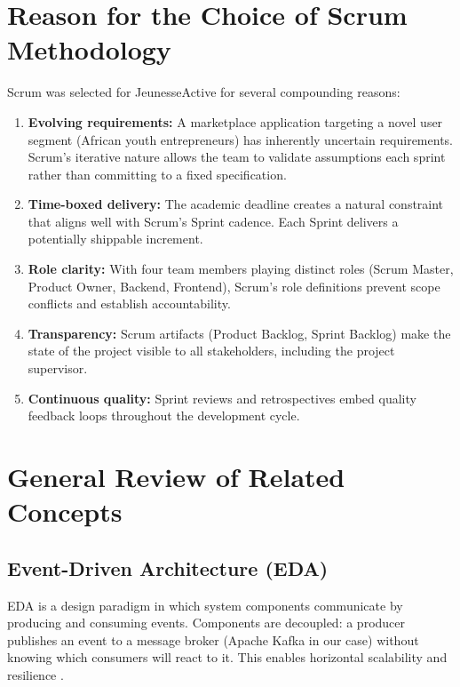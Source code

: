 \documentclass[12pt,a4paper]{report}
\begin{document}
\section{Reason for the Choice of Scrum Methodology}

Scrum was selected for JeunesseActive for several compounding reasons:

\begin{enumerate}
  \item \textbf{Evolving requirements:} A marketplace application targeting a novel user segment (African youth entrepreneurs) has inherently uncertain requirements. Scrum's iterative nature allows the team to validate assumptions each sprint rather than committing to a fixed specification.
  \item \textbf{Time-boxed delivery:} The academic deadline creates a natural constraint that aligns well with Scrum's Sprint cadence. Each Sprint delivers a potentially shippable increment.
  \item \textbf{Role clarity:} With four team members playing distinct roles (Scrum Master, Product Owner, Backend, Frontend), Scrum's role definitions prevent scope conflicts and establish accountability.
  \item \textbf{Transparency:} Scrum artifacts (Product Backlog, Sprint Backlog) make the state of the project visible to all stakeholders, including the project supervisor.
  \item \textbf{Continuous quality:} Sprint reviews and retrospectives embed quality feedback loops throughout the development cycle.
\end{enumerate}

\section{General Review of Related Concepts}

\subsection{Event-Driven Architecture (EDA)}
EDA is a design paradigm in which system components communicate by producing and consuming events. Components are decoupled: a producer publishes an event to a message broker (Apache Kafka in our case) without knowing which consumers will react to it. This enables horizontal scalability and resilience \cite{fowler2017}.
\end{document}
